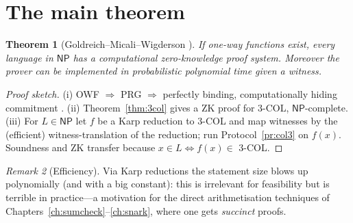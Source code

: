 \documentclass[11pt,a4paper]{report}
\theoremstyle{plain}
\newtheorem{theorem}{Theorem}[chapter]
\theoremstyle{definition}
\theoremstyle{remark}
\newtheorem{remark}[theorem]{Remark}
\newcommand{\NP}{\mathsf{NP}}\newcommand{\BPP}{\mathsf{BPP}}\newcommand{\IP}{\mathsf{IP}}
\begin{document}
\section{The main theorem}
\begin{theorem}[Goldreich--Micali--Wigderson \cite{GMW91}]\label{thm:gmw}
If one-way functions exist, every language in $\NP$ has a computational zero-knowledge proof system. Moreover the prover can be implemented in probabilistic polynomial time given a witness.
\end{theorem}
\begin{proof}[Proof sketch]
(i) OWF $\Rightarrow$ PRG \cite{HILL99} $\Rightarrow$ perfectly binding, computationally hiding commitment \cite{Nao91}. (ii) Theorem~\ref{thm:3col} gives a ZK proof for 3-COL, $\NP$-complete. (iii) For $L\in\NP$ let $f$ be a Karp reduction to 3-COL and map witnesses by the (efficient) witness-translation of the reduction; run Protocol~\ref{pr:col3} on $f(x)$. Soundness and ZK transfer because $x\in L\iff f(x)\in$ 3-COL.
\end{proof}
\begin{center}
\end{center}
\begin{remark}[Efficiency]
Via Karp reductions the statement size blows up polynomially (and with a big constant): this is irrelevant for feasibility but is terrible in practice---a motivation for the direct arithmetisation techniques of Chapters~\ref{ch:sumcheck}--\ref{ch:snark}, where one gets \emph{succinct} proofs.
\end{remark}
\end{document}
